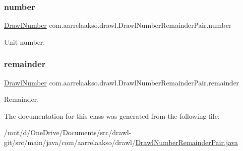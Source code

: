 \subsubsection{\texorpdfstring{number}{number}}
{\footnotesize\ttfamily \hyperlink{classcom_1_1aarrelaakso_1_1drawl_1_1_drawl_number}{Drawl\+Number} com.\+aarrelaakso.\+drawl.\+Drawl\+Number\+Remainder\+Pair.\+number\hspace{0.3cm}{\ttfamily [private]}}



Unit number. 

\mbox{\label{classcom_1_1aarrelaakso_1_1drawl_1_1_drawl_number_remainder_pair_a95c7e55169d65822bbceb08ff2f800dc}} 
\subsubsection{\texorpdfstring{remainder}{remainder}}
{\footnotesize\ttfamily \hyperlink{classcom_1_1aarrelaakso_1_1drawl_1_1_drawl_number}{Drawl\+Number} com.\+aarrelaakso.\+drawl.\+Drawl\+Number\+Remainder\+Pair.\+remainder\hspace{0.3cm}{\ttfamily [private]}}



Remainder. 



The documentation for this class was generated from the following file\+:\begin{DoxyCompactItemize}
\item 
/mnt/d/\+One\+Drive/\+Documents/src/drawl-\/git/src/main/java/com/aarrelaakso/drawl/\hyperlink{_drawl_number_remainder_pair_8java}{Drawl\+Number\+Remainder\+Pair.\+java}\end{DoxyCompactItemize}
